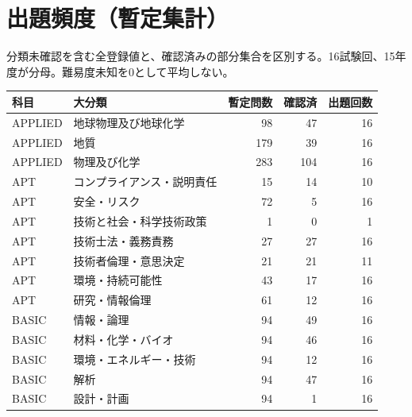 \chapter{出題頻度（暫定集計）}
分類未確認を含む全登録値と、確認済みの部分集合を区別する。16試験回、15年度が分母。難易度未知を0として平均しない。
\begin{longtable}{p{.16\linewidth}p{.42\linewidth}rrr}
科目 & 大分類 & 暫定問数 & 確認済 & 出題回数\\\hline
APPLIED & 地球物理及び地球化学 & 98 & 47 & 16\\
APPLIED & 地質 & 179 & 39 & 16\\
APPLIED & 物理及び化学 & 283 & 104 & 16\\
APT & コンプライアンス・説明責任 & 15 & 14 & 10\\
APT & 安全・リスク & 72 & 5 & 16\\
APT & 技術と社会・科学技術政策 & 1 & 0 & 1\\
APT & 技術士法・義務責務 & 27 & 27 & 16\\
APT & 技術者倫理・意思決定 & 21 & 21 & 11\\
APT & 環境・持続可能性 & 43 & 17 & 16\\
APT & 研究・情報倫理 & 61 & 12 & 16\\
BASIC & 情報・論理 & 94 & 49 & 16\\
BASIC & 材料・化学・バイオ & 94 & 46 & 16\\
BASIC & 環境・エネルギー・技術 & 94 & 12 & 16\\
BASIC & 解析 & 94 & 47 & 16\\
BASIC & 設計・計画 & 94 & 1 & 16\\
\end{longtable}
